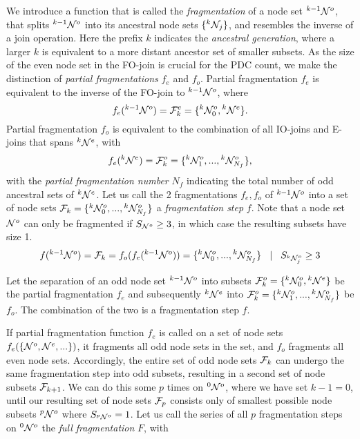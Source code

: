 We introduce a function that is called the \emph{fragmentation} of a node set ${}^{k-1}\mathcal{N}^o$, that splits ${}^{k-1}\mathcal{N}^o$ into its ancestral node sets $\{{}^{k}\mathcal{N}_j\}$, and resembles the inverse of a join operation. Here the prefix $k$ indicates the \emph{ancestral generation}, where a larger $k$ is equivalent to a more distant ancestor set of smaller subsets. As the size of the even node set in the FO-join is crucial for the PDC count, we make the distinction of \emph{partial fragmentations} $f_e$ and $f_o$. Partial fragmentation $f_e$ is equivalent to the inverse of the FO-join to ${}^{k-1}\mathcal{N}^o$, where
\begin{equation}\label{eq:pfe}
  f_e({}^{k-1}\mathcal{N}^o) = \mathcal{F}^e_k = \{{}^{k}\mathcal{N}^o_0, {}^{k}\mathcal{N}^e\}.
\end{equation}
Partial fragmentation $f_o$ is equivalent to the combination of all IO-joins and E-joins that spans ${}^{k}\mathcal{N}^e$, with
\begin{equation}\label{eq:pfo}
  f_e({}^{k}\mathcal{N}^e) = \mathcal{F}^o_k=\{{}^{k}\mathcal{N}^{o}_1,...,{}^{k}\mathcal{N}^o_{N_f}\},
\end{equation}
with the \emph{partial fragmentation number} $N_f$ indicating the total number of odd ancestral sets of ${}^{k}\mathcal{N}^e$. Let us call the 2 fragmentations $f_e, f_o$ of ${}^{k-1}\mathcal{N}^o$ into a set of node sets $\mathcal{F}_k = \{{}^{k}\mathcal{N}^o_0,..., {}^{k}\mathcal{N}^{o}_{N_f}\}$ a \emph{fragmentation step} $f$. Note that a node set $\mathcal{N}^o$ can only be fragmented if $S_{\mathcal{N}^o} \geq 3$, in which case the resulting subsets have size 1.
\begin{equation}\label{eq:fstep}
  f({}^{k-1}\mathcal{N}^o) = \mathcal{F}_k = f_o(f_e({}^{k-1}\mathcal{N}^o)) = \{{}^{k}\mathcal{N}^o_0,...,{}^{k}\mathcal{N}^{o}_{N_f}\} \hspace{.3cm} | \hspace{.3cm} S_{{}^{k}\mathcal{N}^o_j} \geq 3
\end{equation}


\begin{lemma}\label{lem:partialfrag}
  Let the separation of an odd node set ${}^{k-1}\mathcal{N}^o$ into subsets $\mathcal{F}_k^o=\{{}^{k}\mathcal{N}^o_0, {}^{k}\mathcal{N}^e\}$ be the partial fragmentation $f_e$ and subsequently ${}^{k}\mathcal{N}^e$ into  $\mathcal{F}_k^o=\{{}^{k}\mathcal{N}^{o}_1,...,{}^{k}\mathcal{N}^o_{N_f}\}$ be $f_o$. The combination of the two is a fragmentation step $f$.
\end{lemma}

If partial fragmentation function $f_e$ is called on a set of node sets $f_e(\{\mathcal{N}^o, \mathcal{N}^e, ...\})$, it fragments all odd node sets in the set, and $f_o$ fragments all even node sets. Accordingly, the entire set of odd node sets $\mathcal{F}_k$ can undergo the same fragmentation step into odd subsets, resulting in a second set of node subsets $\mathcal{F}_{k+1}$. We can do this some $p$ times on ${}^{0}\mathcal{N}^o$, where we have set $k-1=0$, until our resulting set of node sets $\mathcal{F}_{p}$ consists only of smallest possible node subsets ${}^{p}\mathcal{N}^o$ where $S_{{}^{p}\mathcal{N}^o}=1$. Let us call the series of all $p$ fragmentation steps on ${}^{0}\mathcal{N}^o$ the \emph{full fragmentation} $F$, with

